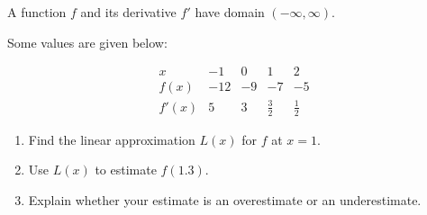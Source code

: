 \documentclass{ximera}
\begin{document}
\begin{exercise}

A function $f$ and its derivative $f'$ have domain $(-\infty,\infty)$.

Some values are given below:

\[
\begin{array}{c|cccc}
x & -1 & 0 & 1 & 2 \\
\hline
f(x) & -12 & -9 & -7 & -5 \\
f'(x) & 5 & 3 & \frac{3}{2} & \frac{1}{2}
\end{array}
\]

\begin{enumerate}
  \item Find the linear approximation $L(x)$ for $f$ at $x=1$.
  \item Use $L(x)$ to estimate $f(1.3)$.
  \item Explain whether your estimate is an overestimate or an underestimate.
\end{enumerate}

\end{exercise}
\end{document}
